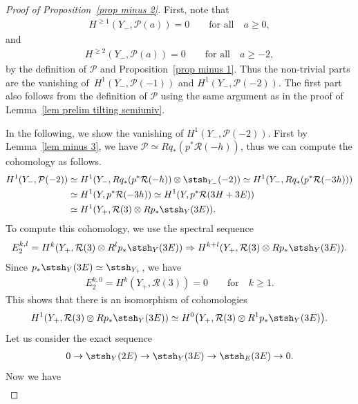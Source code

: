 \begin{proof}[Proof of Proposition~\ref{prop minus 2}]
First, note that
\begin{gather*}
H^{\geq 1}(Y_-, \mathcal{P}(a)) = 0\qquad \text{for all}\quad a \geq 0,
\end{gather*}
and
\begin{gather*}
H^{\geq 2}(Y_-, \mathcal{P}(a)) = 0\qquad \text{for all}\quad a \geq -2,
\end{gather*}
by the definition of $\mathcal{P}$ and Proposition~\ref{prop minus 1}.
Thus the non-trivial parts are the vanishing of~$H^1(Y_-, \mathcal{P}(-1))$ and $H^1(Y_-, \mathcal{P}(-2))$.
The first part also follows from the definition of $\mathcal{P}$ using the same argument as in the proof of Lemma~\ref{lem prelim tilting semiuniv}.


In the following, we show the vanishing of $H^1(Y_-, \mathcal{P}(-2))$.
First by Lemma~\ref{lem minus 3}, we have $\mathcal{P} \simeq Rq_*(p^*\mathcal{R}(-h))$,
thus we can compute the cohomology as follows.
\begin{align*}
H^1(Y_-, \mathcal{P}(-2)) &\simeq H^1(Y_-, Rq_*(p^*\mathcal{R}(-h)) \otimes \stsh_{Y_-}(-2))
\simeq H^1(Y_-, Rq_*(p^*\mathcal{R}(-3h))) \\
&\simeq H^1(Y, p^*\mathcal{R}(-3h))
\simeq H^1(Y, p^*\mathcal{R}(3H+3E))\\
&\simeq H^1(Y_+, \mathcal{R}(3) \otimes Rp_*\stsh_Y(3E)).
\end{align*}
To compute this cohomology, we use the spectral sequence
\begin{gather*}
E^{k,l}_2 = H^k(Y_+, \mathcal{R}(3) \otimes R^lp_*\stsh_Y(3E)) \Rightarrow H^{k+l}(Y_+, \mathcal{R}(3) \otimes Rp_*\stsh_Y(3E)).
\end{gather*}
Since $p_*\stsh_Y(3E) \simeq \stsh_{Y_+}$, we have
\begin{gather*}
E_2^{k, 0} = H^k(Y_+, \mathcal{R}(3)) = 0\qquad \text{for}\quad k \geq 1.
\end{gather*}
This shows that there is an isomorphism of cohomologies
\begin{gather*}
H^1(Y_+, \mathcal{R}(3) \otimes Rp_*\stsh_Y(3E)) \simeq H^0\big(Y_+, \mathcal{R}(3) \otimes R^1p_*\stsh_Y(3E)\big).
\end{gather*}
Let us consider the exact sequence
\begin{gather*}
0 \to \stsh_Y(2E) \to \stsh_Y(3E) \to \stsh_E(3E) \to 0.
\end{gather*}
Now we have
\begin{gather*}

\end{gather*}
\end{proof}
